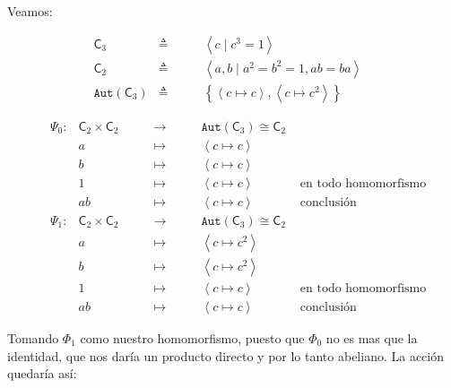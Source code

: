 \documentclass[12pt,a4paper,fleqn,spanish,final,openright]{extbook}
\theoremstyle{definition}
\theoremstyle{remark}
\begin{document}
Veamos:
\begin{flushleft}
\begin{align*}
&{{\mathsf{C}}_{3}} &\triangleq \qquad&{\left\langle{c∣c^3=1}\right\rangle}&&\\
&{{\mathsf{C}}_{2}} &\triangleq \qquad&{\left\langle{a,b∣a^2=b^2=1, ab=ba}\right\rangle}&&\\
&{\mathtt{Aut}}{\left({{\mathsf{C}}_{3}}\right)} &\triangleq \qquad&\left\lbrace{\left\langle c   \mapsto c \right\rangle,\left\langle c   \mapsto c^2 \right\rangle}\right\rbrace&&
\end{align*}

\begin{align*}
&\Psi_0 : &{{{\mathsf{C}}_{2}}   \times   {{\mathsf{C}}_{2}}}\qquad &   \longrightarrow    &{\mathtt{Aut}}{\left({{\mathsf{C}}_{3}}\right)}   \cong   {{\mathsf{C}}_{2}}&\\
&&a&   \mapsto \qquad & \left\langle c   \mapsto c \right\rangle&\\
&&b&   \mapsto \qquad & \left\langle c   \mapsto c \right\rangle&\\
&&1&   \mapsto \qquad & \left\langle c   \mapsto c \right\rangle &\mbox{ en todo homomorfismo}\\
&&ab&   \mapsto \qquad & \left\langle c   \mapsto c \right\rangle &\mbox{ conclusión}\\
&\Psi_1 : &{{{\mathsf{C}}_{2}}   \times   {{\mathsf{C}}_{2}}}\qquad &   \longrightarrow    &{\mathtt{Aut}}{\left({{\mathsf{C}}_{3}}\right)}   \cong   {{\mathsf{C}}_{2}}&\\
&&a&   \mapsto \qquad & \left\langle c   \mapsto c^2 \right\rangle&\\
&&b&   \mapsto \qquad & \left\langle c   \mapsto c^2 \right\rangle&\\
&&1&   \mapsto \qquad & \left\langle c   \mapsto c \right\rangle &\mbox{ en todo homomorfismo}\\
&&ab&   \mapsto \qquad & \left\langle c   \mapsto c \right\rangle &\mbox{ conclusión}
\end{align*}
\end{flushleft}

Tomando $\Phi_1$ como nuestro homomorfismo, puesto que $\Phi_0$ no es mas que la identidad, que nos daría un producto directo y por lo tanto abeliano. La acción quedaría así:
\end{document}

